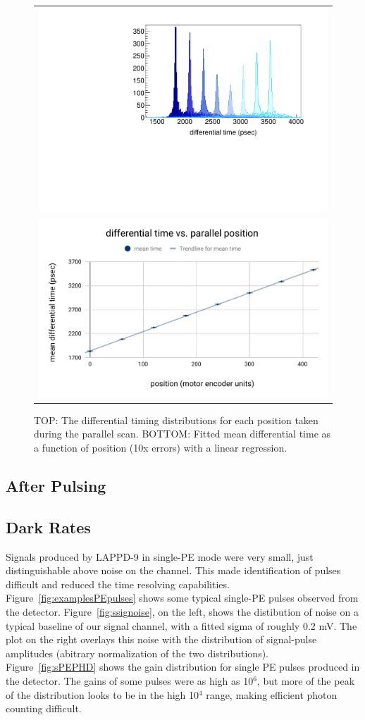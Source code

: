 \documentclass[preprint,12pt]{elsarticle}
\begin{document}
\begin{figure}
	\centering
        \begin{tabular}{l}
                \includegraphics[width=0.6\linewidth]{plots/difftime} \\
                \includegraphics[width=0.55
            \linewidth]{plots/differentialtimevsparallelposition}
         \end{tabular}  
       \caption{TOP: The differential timing distributions for each position taken during the parallel scan. BOTTOM: Fitted mean differential time as a function of position (10x errors) with a linear regression.}
	\label{fig:amp}
\end{figure}


\subsection{After Pulsing}

\subsection{Dark Rates}

\noindent Signals produced by LAPPD-9 in single-PE mode were very small, just distinguishable above noise on the channel. This made identification of pulses difficult and reduced the time resolving capabilities. Figure~\ref{fig:examplesPEpulses} shows some typical single-PE pulses observed from the detector. Figure~\ref{fig:ssignoise}, on the left, shows the distibution of noise on a typical baseline of our signal channel, with a fitted sigma of roughly 0.2 mV. The plot on the right overlays this noise with the distribution of signal-pulse amplitudes (abitrary normalization of the two distributions). Figure~\ref{fig:sPEPHD} shows the gain distribution for single PE pulses produced in the detector. The gains of some pulses  were as high as 10$^6$, but more of the peak of the distribution looks to be in the high 10$^4$ range, making efficient photon counting difficult.
\end{document}
